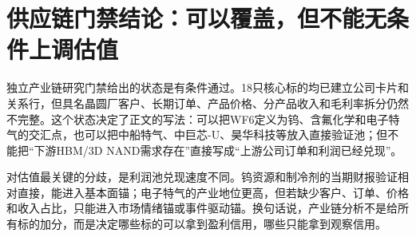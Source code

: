         \section{供应链门禁结论：可以覆盖，但不能无条件上调估值}
        独立产业链研究门禁给出的状态是有条件通过。18只核心标的均已建立公司卡片和关系行，但具名晶圆厂客户、长期订单、产品价格、分产品收入和毛利率拆分仍然不完整。这个状态决定了正文的写法：可以把WF6定义为钨、含氟化学和电子特气的交汇点，也可以把中船特气、中巨芯-U、昊华科技等放入直接验证池；但不能把“下游HBM/3D NAND需求存在”直接写成“上游公司订单和利润已经兑现”。

        对估值最关键的分歧，是利润池兑现速度不同。钨资源和制冷剂的当期财报验证相对直接，能进入基本面锚；电子特气的产业地位更高，但若缺少客户、订单、价格和收入占比，只能进入市场情绪锚或事件驱动锚。换句话说，产业链分析不是给所有标的加分，而是决定哪些标的可以拿到盈利信用，哪些只能拿到观察信用。

        \begin{exhibitbox}[供应链门禁和利润池分层]
        \scriptsize
{}
\end{exhibitbox}

